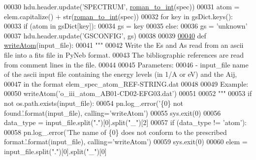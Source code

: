 \begin{DoxyCode}
00030     hdu.header.update(\textcolor{stringliteral}{'SPECTRUM'}, \hyperlink{namespacepyneb_1_1utils_1_1misc_a97329c3ce57bd870421672b90e3e6541}{roman\_to\_int}(spec))
00031     atom = elem.capitalize() + str(\hyperlink{namespacepyneb_1_1utils_1_1misc_a97329c3ce57bd870421672b90e3e6541}{roman\_to\_int}(spec))
00032     \textcolor{keywordflow}{for} key \textcolor{keywordflow}{in} gsDict.keys():
00033         \textcolor{keywordflow}{if} (atom \textcolor{keywordflow}{in} gsDict[key]):
00034             gs = key
00035         \textcolor{keywordflow}{else}:
00036             gs = \textcolor{stringliteral}{'unknown'}
00037     hdu.header.update(\textcolor{stringliteral}{'GSCONFIG'}, gs)
00038     
00039 
\hypertarget{fits_8py_source_l00040}{}\hyperlink{namespacepyneb_1_1utils_1_1fits_a6f08de2b93e2ebc207309560746e9235}{00040} \textcolor{keyword}{def }\hyperlink{namespacepyneb_1_1utils_1_1fits_a6f08de2b93e2ebc207309560746e9235}{writeAtom}(input\_file):
00041     \textcolor{stringliteral}{""" }
00042 \textcolor{stringliteral}{    Write the Es and As read from an ascii file into a fits file in PyNeb format.}
00043 \textcolor{stringliteral}{    The bibliographic references are read from comment lines in the file.}
00044 \textcolor{stringliteral}{        }
00045 \textcolor{stringliteral}{    Parameters:}
00046 \textcolor{stringliteral}{        - input\_file    name of the ascii input file containing the energy levels (in 1/A or eV) and the
       Aij,}
00047 \textcolor{stringliteral}{                        in the format elem\_spec\_atom\_REF-STRING.dat}
00048 \textcolor{stringliteral}{}
00049 \textcolor{stringliteral}{    Example: }
00050 \textcolor{stringliteral}{    writeAtom('o\_iii\_atom\_AB01-CD02-EFG03.dat')}
00051 \textcolor{stringliteral}{}
00052 \textcolor{stringliteral}{    """}
00053     \textcolor{keywordflow}{if} \textcolor{keywordflow}{not} os.path.exists(input\_file):
00054         pn.log\_.error(\textcolor{stringliteral}{'\{0\} not found.'}.format(input\_file), calling=\textcolor{stringliteral}{'writeAtom'})
00055         sys.exit(0)
00056     data\_type = input\_file.split(\textcolor{stringliteral}{"."})[0].split(\textcolor{stringliteral}{"\_"})[2]
00057     \textcolor{keywordflow}{if} (data\_type != \textcolor{stringliteral}{'atom'}):
00058         pn.log\_.error(\textcolor{stringliteral}{'The name of \{0\} does not conform to the prescribed format.'}.format(input\_file), 
      calling=\textcolor{stringliteral}{'writeAtom'})
00059         sys.exit(0)
00060     elem = input\_file.split(\textcolor{stringliteral}{"."})[0].split(\textcolor{stringliteral}{"\_"})[0]

\end{DoxyCode}

